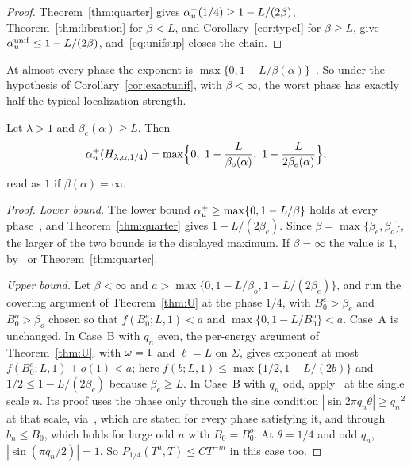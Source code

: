 \begin{proof}
Theorem~\ref{thm:quarter} gives $\alpha_u^+(1/4)\ge1-L/(2\beta)$, Theorem~\ref{thm:libration} for $\beta<L$, and Corollary~\ref{cor:typeI} for $\beta\ge L$, give $\alpha_u^{\mathrm{unif}}\le1-L/(2\beta)$, and~\eqref{eq:unifsup} closes the chain.
\end{proof}

\begin{remark}\label{rem:aevalue}
At almost every phase the exponent is $\max\{0,1-L/\beta(\alpha)\}$~\cite[Theorem~A]{DMamo}. So under the hypothesis of Corollary~\ref{cor:exactunif}, with $\beta<\infty$, the worst phase has exactly half the typical localization strength.
\end{remark}

\begin{corollary}\label{cor:quarterexact}
Let $\lambda>1$ and $\beta_e(\alpha)\ge L$. Then
\[
\au(H_{\lambda,\alpha,1/4})=\max\Bigl\{0,\ 1-\frac L{\beta_o(\alpha)},\ 1-\frac L{2\beta_e(\alpha)}\Bigr\},
\]
read as $1$ if $\beta(\alpha)=\infty$.
\end{corollary}

\begin{proof}
\emph{Lower bound.} The lower bound $\alpha_u^+\ge\max\{0,1-L/\beta\}$ holds at every phase~\cite[Theorem~A]{DMamo}, and Theorem~\ref{thm:quarter} gives $1-L/(2\beta_e)$. Since $\beta=\max\{\beta_e,\beta_o\}$, the larger of the two bounds is the displayed maximum. If $\beta=\infty$ the value is $1$, by~\cite[Theorem~A(2)]{DMamo} or Theorem~\ref{thm:quarter}.

\emph{Upper bound.} Let $\beta<\infty$ and $a>\max\{0,1-L/\beta_o,1-L/(2\beta_e)\}$, and run the covering argument of Theorem~\ref{thm:U} at the phase $1/4$, with $B_0^e>\beta_e$ and $B_0^o>\beta_o$ chosen so that $f(B_0^e;L,1)<a$ and $\max\{0,1-L/B_0^o\}<a$. Case~A is unchanged. In Case~B with $q_n$ even, the per-energy argument of Theorem~\ref{thm:U}, with $\omega=1$ and $\ell=L$ on $\Sigma$, gives exponent at most $f(B_0^e;L,1)+o(1)<a$; here $f(b;L,1)\le\max\{1/2,1-L/(2b)\}$ and $1/2\le1-L/(2\beta_e)$ because $\beta_e\ge L$. In Case~B with $q_n$ odd, apply~\cite[Proposition~7.1]{DMamo} at the single scale $n$. Its proof uses the phase only through the sine condition $|\sin2\pi q_n\theta|\ge q_n^{-2}$ at that scale, via~\cite[Proposition~4.4 and Theorem~5.4]{DMamo}, which are stated for every phase satisfying it, and through $b_n\le B_0$, which holds for large odd $n$ with $B_0=B_0^o$. At $\theta=1/4$ and odd $q_n$, $|\sin(\pi q_n/2)|=1$. So $P_{1/4}(T^a,T)\le CT^{-m}$ in this case too.
\end{proof}

